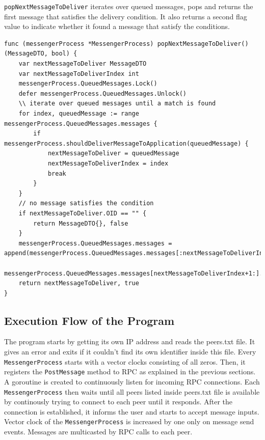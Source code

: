 \documentclass[a4paper]{article}
\begin{document}
\noindent \texttt{popNextMessageToDeliver} iterates over queued messages, pops and returns the first message that satisfies the delivery condition. It also returns a second flag value to indicate whether it found a message that satisfy the conditions.

\begin{lstlisting}[caption={\texttt{popNextMessageToDeliver} helper method}, basicstyle=\ttfamily\tiny]
func (messengerProcess *MessengerProcess) popNextMessageToDeliver() (MessageDTO, bool) {
    var nextMessageToDeliver MessageDTO
    var nextMessageToDeliverIndex int
    messengerProcess.QueuedMessages.Lock()
    defer messengerProcess.QueuedMessages.Unlock()
    \\ iterate over queued messages until a match is found
    for index, queuedMessage := range messengerProcess.QueuedMessages.messages {
        if messengerProcess.shouldDeliverMessageToApplication(queuedMessage) {
            nextMessageToDeliver = queuedMessage
            nextMessageToDeliverIndex = index
            break
        }
    }
    // no message satisfies the condition
    if nextMessageToDeliver.OID == "" {
        return MessageDTO{}, false
    }
    messengerProcess.QueuedMessages.messages = append(messengerProcess.QueuedMessages.messages[:nextMessageToDeliverIndex],
        messengerProcess.QueuedMessages.messages[nextMessageToDeliverIndex+1:]...)
    return nextMessageToDeliver, true
}
\end{lstlisting}

\newpage

\subsection{Execution Flow of the Program}

The program starts by getting its own IP address and reads the peers.txt file. It gives an error and exits if it couldn't find its own identifier inside this file. Every \texttt{MessengerProcess} starts with a vector clocks consisting of all zeros. Then, it registers the \texttt{PostMessage} method to RPC as explained in the previous sections. A goroutine is created to continuously listen for incoming RPC connections. Each \texttt{MessengerProcess} then waits until all peers listed inside peers.txt file is available by continously trying to connect to each peer until it responds. After the connection is established, it informs the user and starts to accept message inputs. Vector clock of the \texttt{MessengerProcess} is increased by one only on message send events. Messages are multicasted by RPC calls to each peer.
\end{document}
